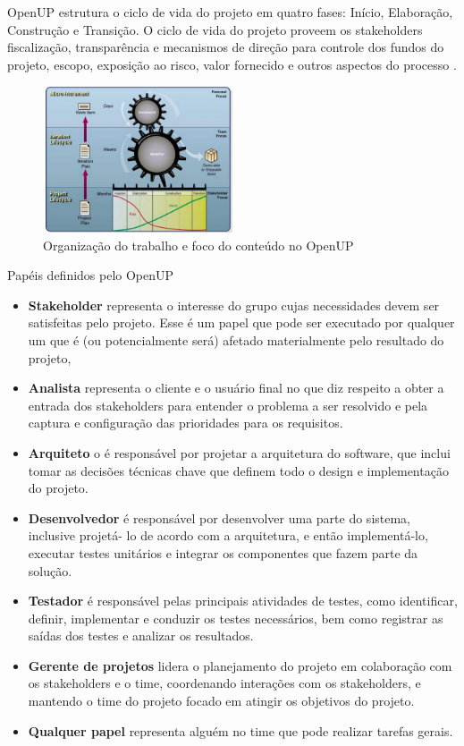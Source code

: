 \documentclass{acm_proc_article-sp}
\begin{document}
OpenUP estrutura o ciclo de vida do projeto em quatro fases: Início, Elaboração, Construção e Transição. O ciclo de vida do projeto proveem os stakeholders fiscalização, transparência e mecanismos de direção para controle dos fundos do projeto, escopo, exposição ao risco, valor fornecido e outros aspectos do processo \cite{openUP:agil}.

\begin{figure}[h]
\centering %
\includegraphics[width=0.5\textwidth]{organizacaoTrabOpenUP.JPG} %
\caption{Organização do trabalho e foco do conteúdo no OpenUP}
\end{figure}

Papéis definidos pelo OpenUP

\begin{itemize}
\item \textbf{Stakeholder} representa o interesse do grupo cujas necessidades devem ser satisfeitas
pelo projeto. Esse é um papel que pode ser executado por qualquer um que é (ou
potencialmente será) afetado materialmente pelo resultado do projeto,
\item \textbf{Analista}  representa o cliente e o usuário final no que diz respeito a obter a entrada
dos stakeholders para entender o problema a ser resolvido e pela captura e
configuração das prioridades para os requisitos.
\item \textbf{Arquiteto} o é responsável por projetar a arquitetura do software, que inclui tomar as
decisões técnicas chave que definem todo o design e implementação do projeto.
\item \textbf{Desenvolvedor} é responsável por desenvolver uma parte do sistema, inclusive projetá-
lo de acordo com a arquitetura, e então implementá-lo, executar testes unitários e
integrar os componentes que fazem parte da solução.
\item \textbf{Testador} é responsável pelas principais atividades de testes, como identificar, definir,
implementar e conduzir os testes necessários, bem como registrar as saídas dos testes
e analizar os resultados.
\item \textbf{Gerente de projetos} lidera o planejamento do projeto em colaboração com os
stakeholders e o time, coordenando interações com os stakeholders, e mantendo o
time do projeto focado em atingir os objetivos do projeto.
\item \textbf{Qualquer papel} representa alguém no time que pode realizar tarefas gerais.
\end{itemize}
\end{document}
